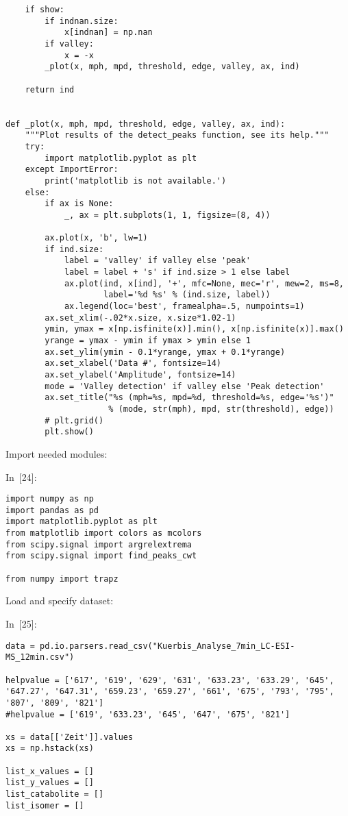 \documentclass[]{article}
\begin{document}
\begin{verbatim}
    if show:
        if indnan.size:
            x[indnan] = np.nan
        if valley:
            x = -x
        _plot(x, mph, mpd, threshold, edge, valley, ax, ind)

    return ind


def _plot(x, mph, mpd, threshold, edge, valley, ax, ind):
    """Plot results of the detect_peaks function, see its help."""
    try:
        import matplotlib.pyplot as plt
    except ImportError:
        print('matplotlib is not available.')
    else:
        if ax is None:
            _, ax = plt.subplots(1, 1, figsize=(8, 4))

        ax.plot(x, 'b', lw=1)
        if ind.size:
            label = 'valley' if valley else 'peak'
            label = label + 's' if ind.size > 1 else label
            ax.plot(ind, x[ind], '+', mfc=None, mec='r', mew=2, ms=8,
                    label='%d %s' % (ind.size, label))
            ax.legend(loc='best', framealpha=.5, numpoints=1)
        ax.set_xlim(-.02*x.size, x.size*1.02-1)
        ymin, ymax = x[np.isfinite(x)].min(), x[np.isfinite(x)].max()
        yrange = ymax - ymin if ymax > ymin else 1
        ax.set_ylim(ymin - 0.1*yrange, ymax + 0.1*yrange)
        ax.set_xlabel('Data #', fontsize=14)
        ax.set_ylabel('Amplitude', fontsize=14)
        mode = 'Valley detection' if valley else 'Peak detection'
        ax.set_title("%s (mph=%s, mpd=%d, threshold=%s, edge='%s')"
                     % (mode, str(mph), mpd, str(threshold), edge))
        # plt.grid()
        plt.show()
\end{verbatim}

Import needed modules:

In~{[}24{]}:

\begin{verbatim}
import numpy as np
import pandas as pd
import matplotlib.pyplot as plt
from matplotlib import colors as mcolors
from scipy.signal import argrelextrema
from scipy.signal import find_peaks_cwt

from numpy import trapz
\end{verbatim}

Load and specify dataset:

In~{[}25{]}:

\begin{verbatim}
data = pd.io.parsers.read_csv("Kuerbis_Analyse_7min_LC-ESI-MS_12min.csv")

helpvalue = ['617', '619', '629', '631', '633.23', '633.29', '645', '647.27', '647.31', '659.23', '659.27', '661', '675', '793', '795', '807', '809', '821']
#helpvalue = ['619', '633.23', '645', '647', '675', '821']

xs = data[['Zeit']].values
xs = np.hstack(xs)

list_x_values = []
list_y_values = []
list_catabolite = []
list_isomer = []
\end{verbatim}
\end{document}
